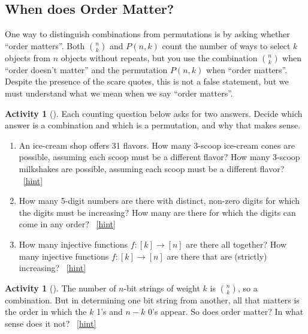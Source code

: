 \documentclass[10pt,]{book}
\theoremstyle{plain}
\theoremstyle{definition}
\theoremstyle{definition}
\theoremstyle{definition}
\newtheorem{activity}[project]{Activity}
\numberwithin{equation}{chapter}
\begin{document}
\subsection[{When does Order Matter?}]{When does Order Matter?}\label{subsec-ordermatters}
\hypertarget{p-350}{}%
One way to distinguish combinations from permutations is by asking whether ``order matters''.  Both \(\binom{n}{k}\) and \(P(n,k)\) count the number of ways to select \(k\) objects from \(n\) objects without repeats, but you use the combination \(\binom{n}{k}\) when ``order doesn't matter'' and the permutation \(P(n,k)\) when ``order matters''.  Despite the presence of the scare quotes, this is not a false statement, but we must understand what we mean when we say ``order matters''.%
\begin{activity}[]\label{activity-54}
\hypertarget{p-351}{}%
Each counting question below asks for two answers.  Decide which answer is a combination and which is a permutation, and why that makes sense.%
\begin{enumerate}[font=\bfseries,label=(\alph*),ref=\alph*]
\item\label{task-78} \hypertarget{p-352}{}%
An ice-cream shop offers 31 flavors.  How many 3-scoop ice-cream cones are possible, assuming each scoop must be a different flavor?  How many 3-scoop milkshakes are possible, assuming each scoop must be a different flavor?%
~\hfill{\tiny\hyperlink{a-54.a}{[hint]}\hypertarget{q-54.a}{}}\item\label{task-79} \hypertarget{p-354}{}%
How many 5-digit numbers are there with distinct, non-zero digits for which the digits must be increasing?  How many are there for which the digits can come in any order?%
~\hfill{\tiny\hyperlink{a-54.b}{[hint]}\hypertarget{q-54.b}{}}\item\label{task-80} \hypertarget{p-356}{}%
How many injective functions \(f:[k] \to [n]\) are there all   together?  How many injective functions \(f:[k] \to [n]\) are there that are (strictly) increasing?%
~\hfill{\tiny\hyperlink{a-54.c}{[hint]}\hypertarget{q-54.c}{}}\end{enumerate}
\end{activity}
\begin{activity}[]\label{activity-55}
\hypertarget{p-358}{}%
The number of \(n\)-bit strings of weight \(k\) is \(\binom{n}{k}\), so a combination.  But in determining one bit string from another, all that matters is the order in which the \(k\) 1's and \(n-k\) 0's appear.  So does order matter?  In what sense does it not?%
~\hfill{\tiny\hyperlink{a-55}{[hint]}\hypertarget{q-55}{}}\end{activity}
\end{document}
